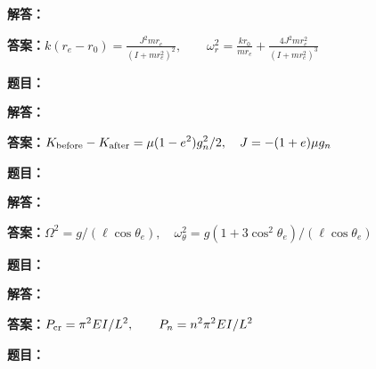 \documentclass[lang=cn,color=blue,11pt]{elegantbook}
\begin{document}
\par\noindent\textbf{解答：}
\par\noindent\textbf{答案：}\(\displaystyle k(r_e-r_0)=\frac{J^2mr_e}{(I+mr_e^2)^2},\qquad\omega_r^2=\frac{kr_0}{mr_e}+\frac{4J^2mr_e^2}{(I+mr_e^2)^3}\)\par
\par\smallskip\noindent\hrulefill\par\medskip
{}\par
\noindent\textbf{题目：}
\par\noindent\textbf{解答：}
\par\noindent\textbf{答案：}\(\displaystyle K_{\rm before}-K_{\rm after}=\mu(1-e^2)g_n^2/2,\quad J=-(1+e)\mu g_n\)\par
\par\smallskip\noindent\hrulefill\par\medskip
{}\par
\noindent\textbf{题目：}
\par\noindent\textbf{解答：}
\par\noindent\textbf{答案：}\(\displaystyle \Omega^2=g/(\ell\cos\theta_e),\quad\omega_\theta^2=g(1+3\cos^2\theta_e)/(\ell\cos\theta_e)\)\par
\par\smallskip\noindent\hrulefill\par\medskip
{}\par
\noindent\textbf{题目：}
\par\noindent\textbf{解答：}
\par\noindent\textbf{答案：}\(\displaystyle P_{\rm cr}=\pi^2 EI/L^2,\qquad P_n=n^2\pi^2EI/L^2\)\par
\par\smallskip\noindent\hrulefill\par\medskip
{}\par
\noindent\textbf{题目：}
\end{document}
